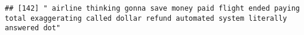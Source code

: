 \documentclass[
]{article}
\begin{document}
\begin{verbatim}
## [142] " airline thinking gonna save money paid flight ended paying total exaggerating called dollar refund automated system literally answered dot"                                                                                                                                                                                                                                                                                                                                                                                                                                                                                                                                                                                                                                                                                                                                                                                                                                                                                                                                                                                                                                                                                                                                                                                                                                                                                                                                                                                                                                                                                                                                                                                                                                                   

\end{verbatim}
\end{document}
